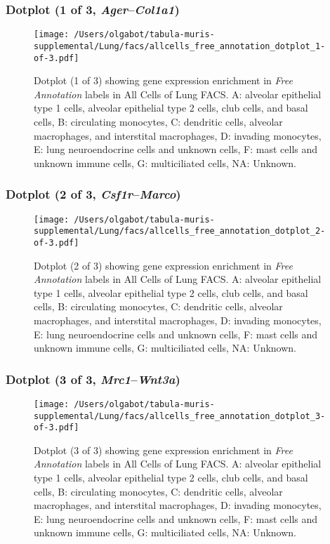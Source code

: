 \clearpage

\subsubsection{Dotplot (1 of 3, \emph{Ager}--\emph{Col1a1})}
\begin{figure}[h]
\centering
\texttt{[image: /Users/olgabot/tabula-muris-supplemental/Lung/facs/allcells\_free\_annotation\_dotplot\_1-of-3.pdf]}

\caption{ Dotplot (1 of 3)  showing gene expression enrichment in \emph{Free Annotation} labels in All Cells of Lung FACS. A: alveolar epithelial type 1 cells, alveolar epithelial type 2 cells, club cells, and basal cells, B: circulating monocytes, C: dendritic cells, alveolar macrophages, and interstital macrophages, D: invading monocytes, E: lung neuroendocrine cells and unknown cells, F: mast cells and unknown immune cells, G: multiciliated cells, NA: Unknown.}
\end{figure}


\clearpage

\subsubsection{Dotplot (2 of 3, \emph{Csf1r}--\emph{Marco})}
\begin{figure}[h]
\centering
\texttt{[image: /Users/olgabot/tabula-muris-supplemental/Lung/facs/allcells\_free\_annotation\_dotplot\_2-of-3.pdf]}

\caption{ Dotplot (2 of 3)  showing gene expression enrichment in \emph{Free Annotation} labels in All Cells of Lung FACS. A: alveolar epithelial type 1 cells, alveolar epithelial type 2 cells, club cells, and basal cells, B: circulating monocytes, C: dendritic cells, alveolar macrophages, and interstital macrophages, D: invading monocytes, E: lung neuroendocrine cells and unknown cells, F: mast cells and unknown immune cells, G: multiciliated cells, NA: Unknown.}
\end{figure}


\clearpage

\subsubsection{Dotplot (3 of 3, \emph{Mrc1}--\emph{Wnt3a})}
\begin{figure}[h]
\centering
\texttt{[image: /Users/olgabot/tabula-muris-supplemental/Lung/facs/allcells\_free\_annotation\_dotplot\_3-of-3.pdf]}

\caption{ Dotplot (3 of 3)  showing gene expression enrichment in \emph{Free Annotation} labels in All Cells of Lung FACS. A: alveolar epithelial type 1 cells, alveolar epithelial type 2 cells, club cells, and basal cells, B: circulating monocytes, C: dendritic cells, alveolar macrophages, and interstital macrophages, D: invading monocytes, E: lung neuroendocrine cells and unknown cells, F: mast cells and unknown immune cells, G: multiciliated cells, NA: Unknown.}
\end{figure}

